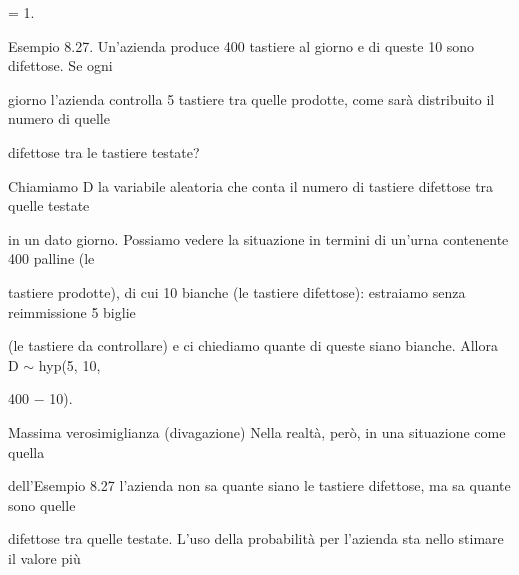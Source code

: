 \documentclass[a4paper,portrait,12pt]{article}
\begin{document}
= 1.





\begin{flushleft}
Esempio 8.27. Un'azienda produce 400 tastiere al giorno e di queste 10 sono difettose. Se ogni
\end{flushleft}


\begin{flushleft}
giorno l'azienda controlla 5 tastiere tra quelle prodotte, come sar\`{a} distribuito il numero di quelle
\end{flushleft}


\begin{flushleft}
difettose tra le tastiere testate?
\end{flushleft}


\begin{flushleft}
Chiamiamo D la variabile aleatoria che conta il numero di tastiere difettose tra quelle testate
\end{flushleft}


\begin{flushleft}
in un dato giorno. Possiamo vedere la situazione in termini di un'urna contenente 400 palline (le
\end{flushleft}


\begin{flushleft}
tastiere prodotte), di cui 10 bianche (le tastiere difettose): estraiamo senza reimmissione 5 biglie
\end{flushleft}


\begin{flushleft}
(le tastiere da controllare) e ci chiediamo quante di queste siano bianche. Allora D $\sim$ hyp(5, 10,
\end{flushleft}


400 $-$ 10).





\begin{flushleft}
Massima verosimiglianza (divagazione) Nella realt\`{a}, per\`{o}, in una situazione come quella
\end{flushleft}


\begin{flushleft}
dell'Esempio 8.27 l'azienda non sa quante siano le tastiere difettose, ma sa quante sono quelle
\end{flushleft}


\begin{flushleft}
difettose tra quelle testate. L'uso della probabilit\`{a} per l'azienda sta nello stimare il valore più
\end{flushleft}
\end{document}
